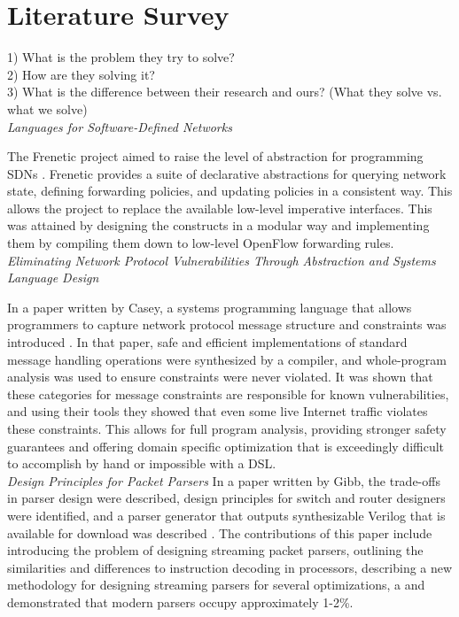 
\section{Literature Survey}
1) What is the problem they try to solve? \\
2) How are they solving it? \\
3) What is the difference between their research and ours?  (What they solve vs.
what we solve) \\


\noindent \emph{Languages for Software-Defined Networks}

The Frenetic project aimed to raise the level of abstraction for 
programming SDNs \cite{Foster2013}. Frenetic provides a suite of declarative
abstractions 
for querying network state, defining forwarding policies, and updating 
policies in a consistent way. This allows the project to replace the 
available low-level imperative interfaces. This was attained by designing 
the constructs in a modular way and implementing them by compiling
them down to low-level OpenFlow forwarding rules. \\

\noindent \emph{Eliminating Network Protocol Vulnerabilities Through Abstraction
	and Systems Language Design}

In a paper written by Casey, a systems programming language that allows
programmers to capture network protocol message structure and constraints was
introduced \cite{Casey2013}. In that paper, safe and efficient implementations
of standard message handling operations were synthesized by a compiler, and
whole-program analysis was used to ensure constraints were never violated. It
was shown that these categories for message constraints are responsible for known
vulnerabilities, and using their tools they showed that even some live Internet traffic 
violates these constraints.
This allows for full program analysis, providing stronger safety guarantees and offering 
domain 
specific optimization that is exceedingly difficult to accomplish by hand or impossible
with a DSL. \\ 

\noindent \emph{Design Principles for Packet Parsers}
In a paper written by Gibb, the trade-offs in parser design were described, design
principles for switch and router designers were identified, and a parser generator that
outputs synthesizable Verilog that is available for download was described \cite{Gibb2013}. The
contributions of this paper include introducing the problem of designing streaming packet
parsers, outlining the similarities and differences to instruction decoding in processors,
describing a new methodology for designing streaming parsers for several optimizations, a
and demonstrated that modern parsers occupy approximately 1-2\%. \\

